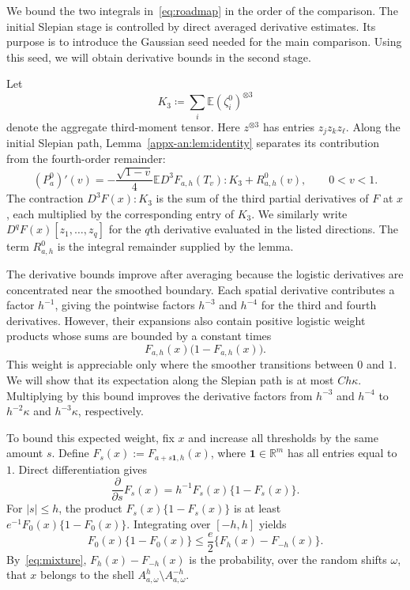 \documentclass[11pt,letterpaper,twoside,leqno]{article}
\theoremstyle{bookplain}
\theoremstyle{bookremark}
\newcommand{\E}{\mathbb E}
\newcommand{\R}{\mathbb R}
\begin{document}
{
We bound the two integrals in~\eqref{eq:roadmap} in the order of the
comparison. {The initial Slepian stage is controlled by direct averaged derivative estimates.} Its purpose is to introduce
the Gaussian seed needed for the main comparison. {Using this seed, we will obtain derivative bounds in the second stage.}

Let
\[
 K_3\coloneqq\sum_i\E(\zeta_i^0)^{\otimes3}
\]
denote the aggregate third-moment tensor.
{
Here \(z^{\otimes3}\) has entries \(z_jz_kz_\ell\).
}
Along the initial Slepian path,
Lemma~\ref{appx-an:lem:identity} separates its contribution from the
fourth-order remainder:
\[
 (P_a^0)'(v)
 =-\frac{\sqrt{1-v}}4\E D^3F_{a,h}(T_v):K_3+R^0_{a,h}(v),
 \qquad 0<v<1.
\]
{
The contraction \(D^3F(x):K_3\) is the sum of the third partial
derivatives of \(F\) at \(x\), each multiplied by the corresponding
entry of \(K_3\). We similarly write
\(D^qF(x)[z_1,\ldots,z_q]\) for the \(q\)th derivative evaluated in
the listed directions. The term \(R^0_{a,h}\) is the integral
remainder supplied by the lemma.
}

{
The derivative bounds improve after averaging because the logistic
 derivatives are concentrated near the smoothed boundary. Each spatial
 derivative contributes a factor \(h^{-1}\), giving the pointwise factors
 \(h^{-3}\) and \(h^{-4}\) for the third and fourth derivatives.
 However, their expansions also contain positive logistic weight products
 whose sums are bounded by a constant times
\[
 F_{a,h}(x)\bigl(1-F_{a,h}(x)\bigr).
\]
This weight is appreciable only where the smoother transitions between
\(0\) and \(1\). We will show that its expectation along the Slepian
path is at most \(Ch{\kappa}\). Multiplying by this bound improves the
 derivative factors from \(h^{-3}\) and \(h^{-4}\) to
\(h^{-2}{\kappa}\) and \(h^{-3}{\kappa}\), respectively.

{
To bound this expected weight, fix \(x\) and increase all thresholds
by the same amount \(s\). Define
\(F_s(x):=F_{a+s\mathbf1,h}(x)\), where \(\mathbf1\in\R^m\)
has all entries equal to \(1\). Direct differentiation gives
\[
 \frac{\partial}{\partial s}F_s(x)
 =h^{-1}F_s(x)\{1-F_s(x)\}.
\]
For \(|s|\le h\), the product \(F_s(x)\{1-F_s(x)\}\) is at least
\(e^{-1}F_0(x)\{1-F_0(x)\}\). Integrating over \([-h,h]\) yields
\[
 F_0(x)\{1-F_0(x)\}
 \le \frac e2\{F_h(x)-F_{-h}(x)\}.
\]
By~\eqref{eq:mixture}, \(F_h(x)-F_{-h}(x)\) is the probability,
over the random shifts \(\omega\), that \(x\) belongs to the shell
\(A_{a,\omega}^{h}\setminus A_{a,\omega}^{-h}\).

}}}
\end{document}
